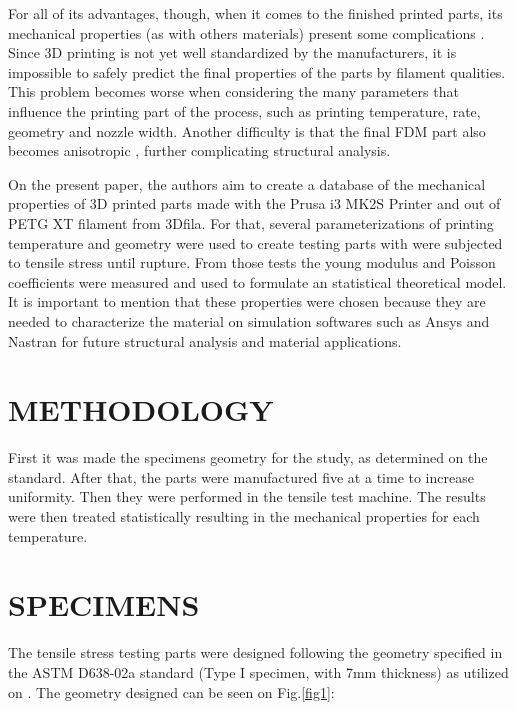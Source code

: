 \documentclass[10pt,fleqn,a4paper,twoside]{article}
\begin{document}
For all of its advantages, though, when it comes to the finished printed parts, its mechanical properties (as with others materials) present some complications \citep{3Dcomplication}. Since 3D printing is not yet well standardized by the manufacturers, it is impossible to safely predict the final properties of the parts by filament qualities. This problem becomes worse when considering the many parameters that influence the printing part of the process, such as printing temperature, rate, geometry and nozzle width. Another difficulty is that the final FDM part also becomes anisotropic \citep{PETG}, further complicating structural analysis. 

On the present paper, the authors aim to create a database of the mechanical properties of 3D printed parts made with the Prusa i3 MK2S Printer and out of PETG XT filament from 3Dfila. For that, several parameterizations of printing temperature and geometry were used to create testing parts with were subjected to tensile stress until rupture. From those tests the young modulus and Poisson coefficients were measured and used to formulate an statistical theoretical model. It is important to mention that these properties were chosen because they are needed to characterize the material on simulation softwares such as Ansys and Nastran for future structural analysis and material applications.  



\section{METHODOLOGY}

First it was made the specimens geometry for the study, as determined on the standard. After that, the parts were manufactured five at a time to increase uniformity. Then they were performed in the tensile test machine. The results were then treated statistically resulting in the mechanical properties for each temperature.


\vspace{3cm}


\section{SPECIMENS}

The tensile stress testing parts were designed following the geometry specified in the ASTM D638-02a standard (Type I specimen, with 7mm thickness) as utilized on \citep{test_on_fdm}. The geometry designed can be seen on Fig.\ref{fig1}:
\end{document}
